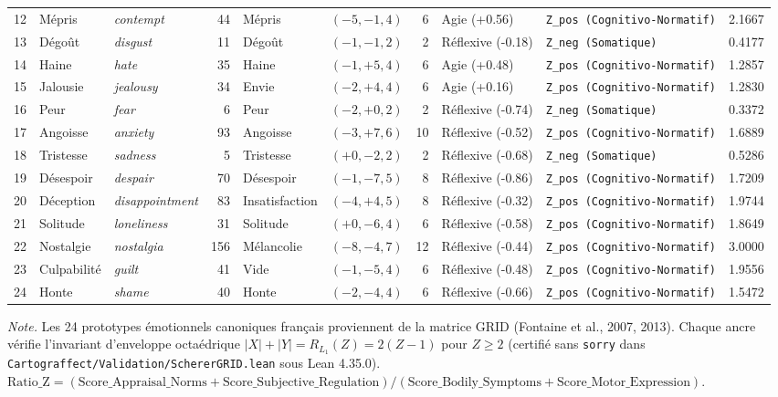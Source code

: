 \begin{table}[htbp]
\begin{threeparttable}
\begin{tabular}{r l l r l c r l l r}
12 & Mépris & \textit{contempt} & 44 & Mépris & $(-5, -1, 4)$ & 6 & Agie (+0.56) & \texttt{Z\_pos (Cognitivo-Normatif)} & 2.1667 \\
13 & Dégoût & \textit{disgust} & 11 & Dégoût & $(-1, -1, 2)$ & 2 & Réflexive (-0.18) & \texttt{Z\_neg (Somatique)} & 0.4177 \\
14 & Haine & \textit{hate} & 35 & Haine & $(-1, +5, 4)$ & 6 & Agie (+0.48) & \texttt{Z\_pos (Cognitivo-Normatif)} & 1.2857 \\
15 & Jalousie & \textit{jealousy} & 34 & Envie & $(-2, +4, 4)$ & 6 & Agie (+0.16) & \texttt{Z\_pos (Cognitivo-Normatif)} & 1.2830 \\
16 & Peur & \textit{fear} & 6 & Peur & $(-2, +0, 2)$ & 2 & Réflexive (-0.74) & \texttt{Z\_neg (Somatique)} & 0.3372 \\
17 & Angoisse & \textit{anxiety} & 93 & Angoisse & $(-3, +7, 6)$ & 10 & Réflexive (-0.52) & \texttt{Z\_pos (Cognitivo-Normatif)} & 1.6889 \\
18 & Tristesse & \textit{sadness} & 5 & Tristesse & $(+0, -2, 2)$ & 2 & Réflexive (-0.68) & \texttt{Z\_neg (Somatique)} & 0.5286 \\
19 & Désespoir & \textit{despair} & 70 & Désespoir & $(-1, -7, 5)$ & 8 & Réflexive (-0.86) & \texttt{Z\_pos (Cognitivo-Normatif)} & 1.7209 \\
20 & Déception & \textit{disappointment} & 83 & Insatisfaction & $(-4, +4, 5)$ & 8 & Réflexive (-0.32) & \texttt{Z\_pos (Cognitivo-Normatif)} & 1.9744 \\
21 & Solitude & \textit{loneliness} & 31 & Solitude & $(+0, -6, 4)$ & 6 & Réflexive (-0.58) & \texttt{Z\_pos (Cognitivo-Normatif)} & 1.8649 \\
22 & Nostalgie & \textit{nostalgia} & 156 & Mélancolie & $(-8, -4, 7)$ & 12 & Réflexive (-0.44) & \texttt{Z\_pos (Cognitivo-Normatif)} & 3.0000 \\
23 & Culpabilité & \textit{guilt} & 41 & Vide & $(-1, -5, 4)$ & 6 & Réflexive (-0.48) & \texttt{Z\_pos (Cognitivo-Normatif)} & 1.9556 \\
24 & Honte & \textit{shame} & 40 & Honte & $(-2, -4, 4)$ & 6 & Réflexive (-0.66) & \texttt{Z\_pos (Cognitivo-Normatif)} & 1.5472 \\
\bottomrule
\end{tabular}
\begin{tablenotes}
\footnotesize
\textit{Note.} Les 24 prototypes émotionnels canoniques français proviennent de la matrice GRID (Fontaine et al., 2007, 2013). Chaque ancre vérifie l'invariant d'enveloppe octaédrique $|X| + |Y| = R_{L_1}(Z) = 2(Z - 1)$ pour $Z \ge 2$ (certifié sans \texttt{sorry} dans \texttt{Cartograffect/Validation/SchererGRID.lean} sous Lean 4.35.0). $\text{Ratio\_Z} = (\text{Score\_Appraisal\_Norms} + \text{Score\_Subjective\_Regulation}) / (\text{Score\_Bodily\_Symptoms} + \text{Score\_Motor\_Expression})$.
\end{tablenotes}
\end{threeparttable}
\end{table}

